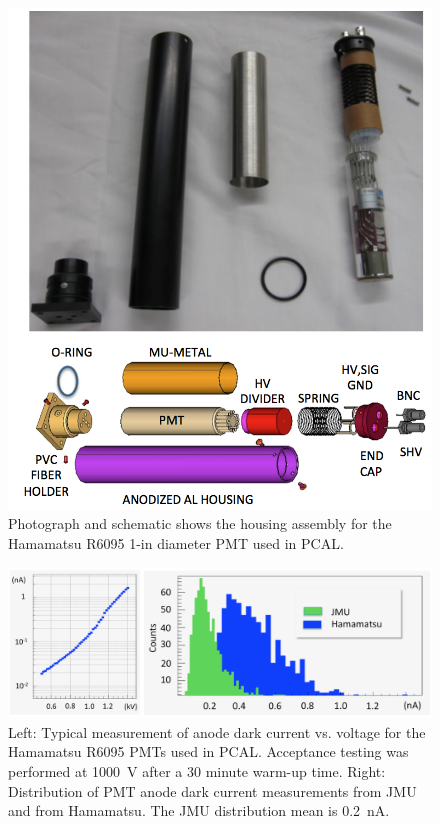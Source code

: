 \begin{figure}[hbt]
\centering
\includegraphics[width=0.85\columnwidth,keepaspectratio]{img/S4_PMT.png}
\caption{Photograph and schematic shows the housing assembly for the Hamamatsu R6095 1-in diameter PMT
  used in PCAL.}
\label{fig:S4_PMT}
\end{figure}

\begin{figure}[hbt]
\centering
\includegraphics[width=1.0\columnwidth,keepaspectratio]{img/S4_PMT_2.png}
\caption{Left: Typical measurement of anode dark current vs. voltage for the Hamamatsu R6095 PMTs used in
  PCAL. Acceptance testing was performed at 1000~V after a 30 minute warm-up time. Right: Distribution of PMT anode dark current
  measurements from JMU and from Hamamatsu. The JMU distribution mean is 0.2~nA.}
\label{fig:S4_PMT_2}
\end{figure}

